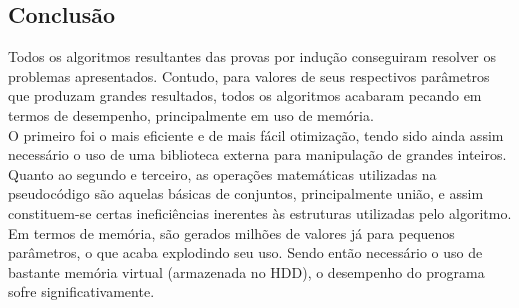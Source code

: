 \documentclass[twoside]{article}
\begin{document}
\begin{multicols}{2}
\section{Conclusão}
\indent Todos os algoritmos resultantes das provas por indução conseguiram resolver os problemas apresentados. Contudo, para valores de seus respectivos parâmetros que produzam grandes resultados, todos os algoritmos acabaram pecando em termos de desempenho, principalmente em uso de memória.\\

\indent O primeiro foi o mais eficiente e de mais fácil otimização, tendo sido ainda assim necessário o uso de uma biblioteca externa para manipulação de grandes inteiros.\\

\indent Quanto ao segundo e terceiro, as operações matemáticas utilizadas na pseudocódigo são aquelas básicas de conjuntos, principalmente união, e assim constituem-se certas ineficiências inerentes às estruturas utilizadas pelo algoritmo. Em termos de memória, são gerados milhões de valores já para pequenos parâmetros, o que acaba explodindo seu uso. Sendo então necessário o uso de bastante memória virtual (armazenada no HDD), o desempenho do programa sofre significativamente.\\

\indent 







\end{multicols}
\end{document}

